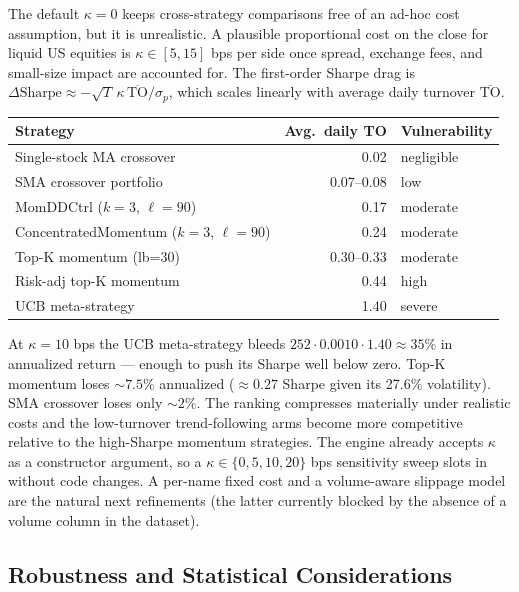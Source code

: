 \documentclass[11pt]{article}
\begin{document}
The default $\kappa = 0$ keeps cross-strategy comparisons free of an
ad-hoc cost assumption, but it is unrealistic. A plausible
proportional cost on the close for liquid US equities is
$\kappa \in [5, 15]$ bps per side once spread, exchange fees, and
small-size impact are accounted for. The first-order Sharpe drag is
$\Delta\mathrm{Sharpe} \approx
-\sqrt{T}\,\kappa\,\overline{\mathrm{TO}} / \sigma_p$, which scales
linearly with average daily turnover $\overline{\mathrm{TO}}$.

\begin{small}
\begin{tabular}{lrl}
\toprule
\textbf{Strategy} & \textbf{Avg.\ daily TO} & \textbf{Vulnerability} \\
\midrule
Single-stock MA crossover                  & 0.02       & negligible \\
SMA crossover portfolio                    & 0.07--0.08 & low \\
MomDDCtrl ($k{=}3$, $\ell{=}90$)           & 0.17       & moderate \\
ConcentratedMomentum ($k{=}3$, $\ell{=}90$)& 0.24       & moderate \\
Top-K momentum (lb=30)                     & 0.30--0.33 & moderate \\
Risk-adj top-K momentum                    & 0.44       & high \\
UCB meta-strategy                          & 1.40       & severe \\
\bottomrule
\end{tabular}
\end{small}

At $\kappa = 10$ bps the UCB meta-strategy bleeds
$252 \cdot 0.0010 \cdot 1.40 \approx 35\%$ in annualized return ---
enough to push its Sharpe well below zero. Top-K momentum loses
$\sim 7.5\%$ annualized ($\approx 0.27$ Sharpe given its 27.6\%
volatility). SMA crossover loses only $\sim 2\%$. The ranking
compresses materially under realistic costs and the low-turnover
trend-following arms become more competitive relative to the
high-Sharpe momentum strategies. The engine already accepts $\kappa$
as a constructor argument, so a $\kappa \in \{0, 5, 10, 20\}$ bps
sensitivity sweep slots in without code changes. A per-name fixed
cost and a volume-aware slippage model are the natural next
refinements (the latter currently blocked by the absence of a volume
column in the dataset).

\subsection*{Robustness and Statistical Considerations}
\end{document}
